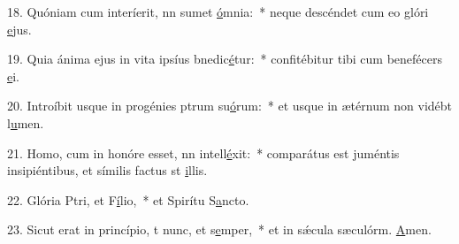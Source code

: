 18. Quóniam cum interíerit, nn sumet \uline{ó}mnia:~* neque descéndet cum eo glóri \uline{e}jus.\par 
19. Quia ánima ejus in vita ipsíus bnedic\uline{é}tur:~* confitébitur tibi cum benefécers \uline{e}i.\par 
20. Introíbit usque in progénies ptrum su\uline{ó}rum:~* et usque in ætérnum non vidébt l\uline{u}men.\par 
21. Homo, cum in honóre esset, nn intell\uline{é}xit:~* comparátus est juméntis insipiéntibus, et símilis factus st \uline{i}llis.\par 
22. Glória Ptri, et F\uline{í}lio,~* et Spirítu S\uline{a}ncto.\par 
23. Sicut erat in princípio, t nunc, et s\uline{e}mper,~* et in sǽcula sæculórm. \uline{A}men.\par 
